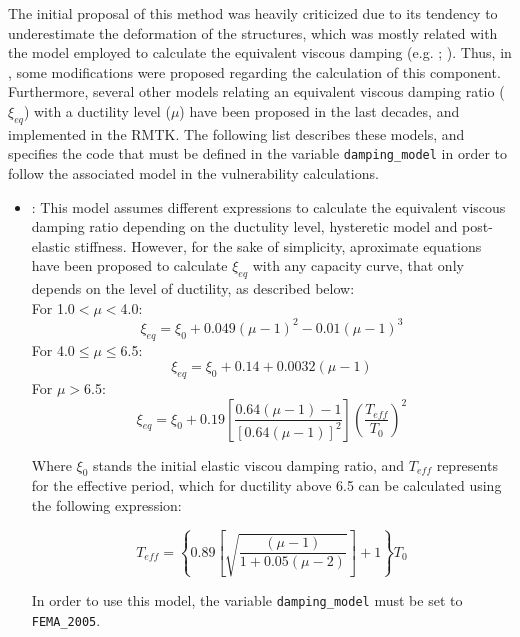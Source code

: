 The initial proposal of this method was heavily criticized due to its tendency to underestimate the deformation of the structures, which was mostly related with the model employed to calculate the equivalent viscous damping (e.g. \cite{Fajfar1999}; \cite{ChopraGoel2010}). Thus, in \cite{FEMA4402005}, some modifications were proposed regarding the calculation of this component. Furthermore, several other models relating an equivalent viscous damping ratio ($\xi_{eq}$) with a ductility level ($\mu$) have been proposed in the last decades, and implemented in the RMTK. The following list describes these models, and specifies the code that must be defined in the variable \verb=damping_model= in order to follow the associated model in the vulnerability calculations.\\

\begin{itemize}
\item \cite{FEMA4402005}: This model assumes different expressions to calculate the equivalent viscous damping ratio depending on the ductulity level, hysteretic model and post-elastic stiffness. However, for the sake of simplicity, aproximate equations have been proposed to calculate $\xi_{eq}$ with any capacity curve, that only depends on the level of ductility, as described below:\\

For 1.0$<\mu<$4.0:
\begin{equation}
\xi_{eq} = \xi_0 + 0.049\left(\mu-1\right)^2-0.01\left(\mu-1\right)^3
\end{equation} 
For 4.0$	\le\mu\le$6.5:
\begin{equation}
\xi_{eq} = \xi_0 + 0.14+0.0032\left(\mu-1\right)
\end{equation} 
For $\mu>$6.5:
\begin{equation}
\xi_{eq} = \xi_0 + 0.19\left[\frac{0.64\left(\mu-1\right)-1}{\left[0.64\left(\mu-1\right)\right]^2}\right]\left(\frac{T_{eff}}{T_0}\right)^2
\end{equation} 

Where $\xi_0$ stands the initial elastic viscou damping ratio, and $T_{eff}$ represents for the effective period, which for ductility above 6.5 can be calculated using the following expression:

\begin{equation}
T_{eff} = \left\{0.89\left[\sqrt{\frac{(\mu-1)}{1+0.05(\mu-2)}}\right]+1\right\}T_0
\end{equation}

In order to use this model, the variable \verb=damping_model= must be set to \verb=FEMA_2005=.\\


\end{itemize}
